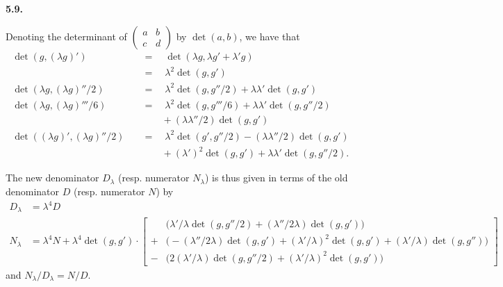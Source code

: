 \documentclass{report}
\newenvironment{rmenv}[1]
  {\phantomsection\par\medskip\noindent\textbf{#1.}\rmfamily}
  {\medskip}
\newcommand{\detrow}[2]{\operatorname{det}(#1,#2)}
\begin{document}
\begin{rmenv}{5.9}
\begin{enumerate}[(i)]
      Denoting the determinant of $\left(\begin{array}{cc}a&b\\c&d\end{array}\right)$ by $\detrow{a}{b}$, we have that
      \[
        \begin{aligned}
          \detrow{g}{(\lambda g)'}
          \quad&=\quad \detrow{\lambda g}{\lambda g'+\lambda' g}
        \\[0.5em]
          &=\quad \lambda^2\detrow{g}{g'}
        \\[1em]
          \detrow{\lambda g}{(\lambda g)''/2}
          \quad&=\quad \lambda^2\detrow{g}{g''/2}
          + \lambda\lambda'\detrow{g}{g'}
        \\[1em]
          \detrow{\lambda g}{(\lambda g)'''/6}
          \quad&=\quad \lambda^2\detrow{g}{g'''/6}
          + \lambda\lambda'\detrow{g}{g''/2}
        \\[0.5em]
          &\qquad+ (\lambda\lambda''/2)\detrow{g}{g'}
        \\[1em]
          \detrow{(\lambda g)'}{(\lambda g)''/2}
          \quad&=\quad \lambda^2\detrow{g'}{g''/2}
          - (\lambda\lambda''/2)\detrow{g}{g'}
        \\[0.5em]
          &\qquad+ (\lambda')^2\detrow{g}{g'}
          + \lambda\lambda'\detrow{g}{g''/2}.
        \end{aligned}
      \]

      The new denominator $D_\lambda$ (resp. numerator $N_\lambda$) is thus given in terms of the old denominator $D$ (resp. numerator $N$) by
      \[
        \begin{aligned}
          D_\lambda
          &= \lambda^4 D
        \\N_\lambda
          &= \lambda^4 N + \lambda^4\detrow{g}{g'}\cdot
          \left[
            \begin{aligned}
              &\Big(
                \lambda'/\lambda\detrow{g}{g''/2}
                + (\lambda''/2\lambda)\detrow{g}{g'}
              \Big)
            \\+&\Big(
                -(\lambda''/2\lambda)\detrow{g}{g'}
                +(\lambda'/\lambda)^2\detrow{g}{g'}
                +(\lambda'/\lambda)\detrow{g}{g''}
              \Big)
            \\-&\Big(
                2(\lambda'/\lambda)\detrow{g}{g''/2}
                + (\lambda'/\lambda)^2\detrow{g}{g'}
              \Big)
            \end{aligned}
          \right]
        \end{aligned}
      \]
      and $N_\lambda/D_\lambda=N/D$.


\end{enumerate}
\end{rmenv}
\end{document}
